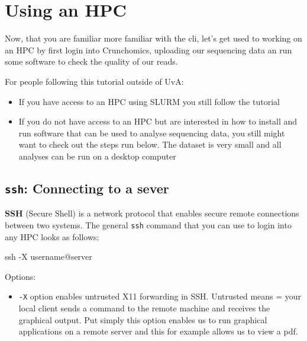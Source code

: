 \documentclass[
  letterpaper,
  DIV=11,
  numbers=noendperiod]{scrreprt}
\author{}
\date{}
\newenvironment{Shaded}{}{}
\newcommand{\AttributeTok}[1]{\textcolor[rgb]{0.84,0.23,0.29}{#1}}
\newcommand{\FunctionTok}[1]{\textcolor[rgb]{0.44,0.26,0.76}{#1}}
\newcommand{\NormalTok}[1]{\textcolor[rgb]{0.14,0.16,0.18}{#1}}
\providecommand{\tightlist}{%
  \setlength{\itemsep}{0pt}\setlength{\parskip}{0pt}}\usepackage{longtable,booktabs,array}
\renewcommand*\contentsname{Table of contents}
\newcommand\contentsname{Table of contents}
\begin{document}

\renewcommand*\contentsname{Table of contents}
{
\hypersetup{linkcolor=}
\setcounter{tocdepth}{2}
\tableofcontents
}
\chapter{Using an HPC}\label{using-an-hpc}

Now, that you are familiar more familiar with the cli, let's get used to
working on an HPC by first login into Crunchomics, uploading our
sequencing data an run some software to check the quality of our reads.

For people following this tutorial outside of UvA:

\begin{itemize}
\tightlist
\item
  If you have access to an HPC using SLURM you still follow the tutorial
\item
  If you do not have access to an HPC but are interested in how to
  install and run software that can be used to analyse sequencing data,
  you still might want to check out the steps run below. The dataset is
  very small and all analyses can be run on a desktop computer
\end{itemize}

\section{\texorpdfstring{\texttt{ssh}: Connecting to a
sever}{ssh: Connecting to a sever}}\label{ssh-connecting-to-a-sever}

\textbf{SSH} (Secure Shell) is a network protocol that enables secure
remote connections between two systems. The general \texttt{ssh} command
that you can use to login into any HPC looks as follows:

\begin{Shaded}
\begin{Highlighting}[]
\FunctionTok{ssh} \AttributeTok{{-}X}\NormalTok{ username@server}
\end{Highlighting}
\end{Shaded}

Options:

\begin{itemize}
\tightlist
\item
  \texttt{-X} option enables untrusted X11 forwarding in SSH. Untrusted
  means = your local client sends a command to the remote machine and
  receives the graphical output. Put simply this option enables us to
  run graphical applications on a remote server and this for example
  allows us to view a pdf.
\end{itemize}
\end{document}
